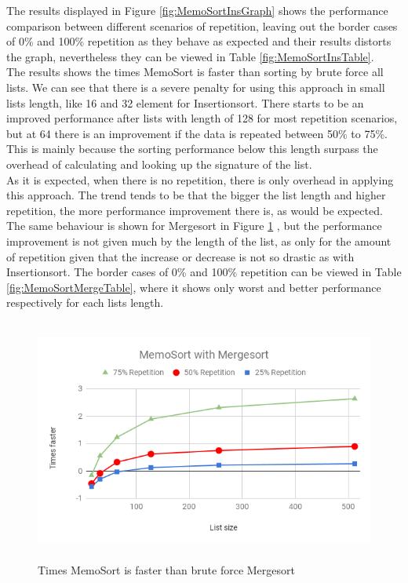 \documentclass[a4paper,12pt]{article}
\begin{document}
The results displayed in Figure \ref{fig:MemoSortInsGraph} shows the performance comparison between different scenarios of repetition, leaving out the border cases of 0\% and 100\% repetition as they behave as expected and their results distorts the graph, nevertheless they can be viewed in Table \ref{fig:MemoSortInsTable}. \\

The results shows the times MemoSort is faster than sorting by brute force all lists. We can see that there is a severe penalty for using this approach in small lists length, like 16 and 32 element for Insertionsort. There starts to be an improved performance after lists with length of 128 for most repetition scenarios, but at 64 there is an improvement if the data is repeated between 50\% to 75\%. This is  mainly because the sorting performance below this length surpass the overhead of calculating and looking up the signature of the list. \\
As it is expected, when there is no repetition, there is only overhead in applying this approach. The trend tends to be that the bigger the list length and higher repetition, the more performance improvement there is, as would be expected.\\

The same behaviour is shown for Mergesort in Figure  \ref{fig:MemoSortMergeGraph} , but the performance improvement is not given much by the length of the list, as only for the amount of repetition given that the increase or decrease is not so drastic as with Insertionsort. The border cases of 0\% and 100\% repetition can be viewed in Table \ref{fig:MemoSortMergeTable}, where it shows only worst and better performance respectively for each lists length.

\begin{figure}[H]
    \centering
    \includegraphics[height=8cm,keepaspectratio]{./images/MemoSortMerge.png}
    \caption{Times MemoSort is faster than brute force Mergesort }
    \label{fig:MemoSortMergeGraph}
\end{figure}
\end{document}

